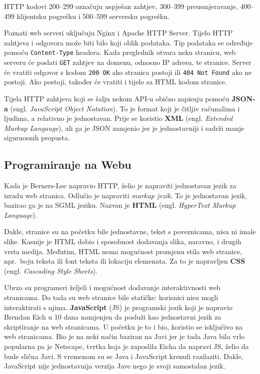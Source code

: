 HTTP kodovi 200--299 označuju uspješan zahtjev, 300--399 preusmjeravanje, 400--499 klijentsku pogrešku i 500--599 serversku pogrešku.

Poznati web serveri uključuju Nginx i Apache HTTP Server.
Tijelo HTTP zahtjeva i odgovora može biti bilo koji oblik podataka.
Tip podataka se određuje pomoću \verb|Content-Type| headera.
Kada preglednik otvara neku stranicu, web serveru će poslati \verb|GET| zahtjev na domenu, odnosno IP adresu, te stranice.
Server će vratiti odgovor s kodom \verb|200 OK| ako stranica postoji ili \verb|404 Not Found| ako ne postoji.
Ako postoji, također će vratiti i tijelo sa HTML kodom stranice.

Tijela HTTP zahtjeva koji se šalju nekom API-u obično zapisuju pomoću \textbf{JSON-a} (engl. \textit{JavaScript Object Notation}).
To je format koji je čitljiv računalima i ljudima, a relativno je jednostavan.
Prije se koristio \textbf{XML} (engl. \textit{Extended Markup Langauge}), ali ga je JSON zamjenio jer je jednostavniji i sadrži manje sigurnosnih propusta.

\subsection{Programiranje na Webu}

Kada je Berners-Lee napravio HTTP, želio je napraviti jednostavan jezik za izradu web stranica.
Odlučio je napraviti \textit{markup jezik}.
To je jednostavan jezik, bazirao ga je na SGML jeziku.
Nazvan je \textbf{HTML} (engl. \textit{HyperText Markup Language}).



Dakle, stranice su na početku bile jednostavne, tekst s poveznicama, nisu ni imale slike.
Kasnije je HTML dobio i sposobnost dodavanja slika, naravno, i drugih vrsta medija.
Međutim, HTML nema mogućnost promjenu stila web stranice, npr.\ boju teksta ili font teksta ili lokaciju elemenata.
Za to je napravljen \textbf{CSS} (engl. \textit{Cascading Style Sheets}).



Ubrzo su programeri željeli i mogućnost dodavanje interaktivnosti web stranicama.
Do tada su web stranice bile statičke: korisnici nisu mogli interaktirati s njima.
\textbf{JavaScript} (JS) je programski jezik koji je napravio Brendan Eich u 10 dana namjenjen da posluži kao jednostavni jezik za skriptiranje na web stranicama.
U početku je to i bio, koristio se isključivo na web stranicama.
Bio je na neki način baziran na Javi jer je tada Java bila vrlo popularna pa je Netscape, tvrtka koja je zaposlila Eicha da napravi JS, želio da bude slična Javi.
S vremenom su se Java i JavaScript krenuli razilaziti.
Dakle, JavaScript nije jednostavnija verzija Jave nego je svoji samostalan jezik.


